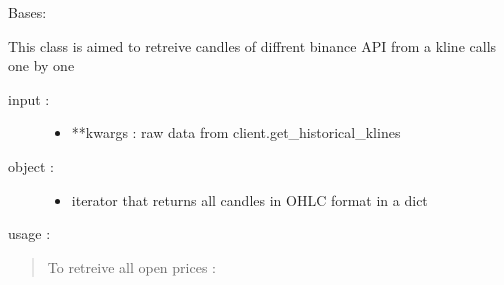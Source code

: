 \documentclass[letterpaper,10pt,english]{sphinxmanual}
\begin{document}
\begin{fulllineitems}
\label{\detokenize{my_tools.cryptools:my_tools.cryptools.mock.klines_mock}}
\sphinxAtStartPar
Bases: 

\sphinxAtStartPar
This class is aimed to retreive candles of diffrent binance API from a kline calls one by one
\begin{description}
\item[{input :}] \leavevmode\begin{itemize}
\item {} 
\sphinxAtStartPar
**kwargs : raw data from client.get\_historical\_klines

\end{itemize}

\item[{object :}] \leavevmode\begin{itemize}
\item {} 
\sphinxAtStartPar
iterator that returns all candles in OHLC format in a dict

\end{itemize}

\end{description}

\sphinxAtStartPar
usage :
\begin{quote}

\sphinxAtStartPar
To retreive all open prices :

\begin{sphinxVerbatim}[commandchars=\\\{\}]
    
    \PYG{p}{[}\PYG{p}{]}\PYG{p}{[}\PYG{p}{]} \PYG{p}{[}\PYG{p}{]}\PYG{p}{[}\PYG{p}{]}
\end{sphinxVerbatim}
\end{quote}

\end{fulllineitems}
\end{document}
